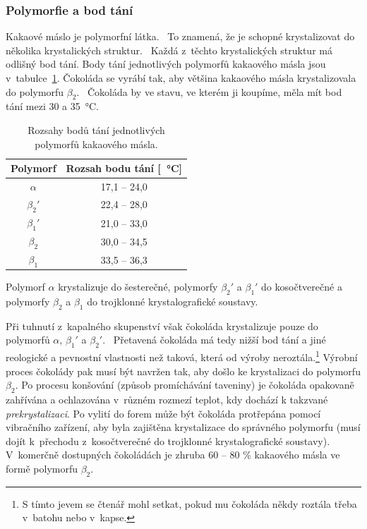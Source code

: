 \documentclass[12pt]{article}
\begin{document}
\subsubsection{Polymorfie a bod tání}%
\label{sec:polymorfie}

Kakaové máslo je polymorfní látka.~\cite{Article:cocoa_butter_polymorphism} To znamená, že je schopné krystalizovat do několika krystalických struktur.~\cite{wiki:Polymorfie} Každá z~těchto krystalických struktur má odlišný bod tání. Body tání jednotlivých polymorfů kakaového másla jsou v~tabulce~\ref{tab:polymorfy}. Čokoláda se vyrábí tak, aby většina kakaového másla krystalizovala do polymorfu $\beta_2$.~\cite{Article:cocoa_butter_tempering} Čokoláda by ve stavu, ve kterém ji koupíme, měla mít bod tání mezi 30 a \SI{35}{\degreeCelsius}.

\begin{table}
    \centering
    \begin{tabular}{|c|c|}
        \hline
        Polymorf & Rozsah bodu tání [\SI{}{\degreeCelsius}] \\\hline
        $\alpha$ & 17,1 -- 24,0\\
        $\beta_2'$ & 22,4 -- 28,0\\
        $\beta_1'$ & 21,0 -- 33,0\\
        $\beta_2$ & 30,0 -- 34,5\\
        $\beta_1$ & 33,5 -- 36,3\\
        \hline
    \end{tabular}
    \caption{Rozsahy bodů tání jednotlivých polymorfů kakaového másla.\cite{Article:cocoa_butter_polymorphism}}
    \label{tab:polymorfy}
\end{table}

Polymorf $\alpha$ krystalizuje do šesterečné, polymorfy $\beta_2'$ a $\beta_1'$ do kosočtverečné a polymorfy $\beta_2$ a $\beta_1$ do trojklonné krystalografické soustavy.~\cite{Article:precrystallization}\cite{wiki:crystal_structure}
\par\noindent
Při tuhnutí z~kapalného skupenství však čokoláda krystalizuje pouze do polymorfů $\alpha$, $\beta_1'$ a $\beta_2'$.~\cite{Article:molecular_polymorphism} Přetavená čokoláda má tedy nižší bod tání a jiné reologické a pevnostní vlastnosti než taková, která od výroby neroztála.\footnote{S tímto jevem se čtenář mohl setkat, pokud mu čokoláda někdy roztála třeba v~batohu nebo v~kapse.} Výrobní proces čokolády pak musí být navržen tak, aby došlo ke krystalizaci do polymorfu $\beta_2$. Po procesu konšování (způsob promíchávání taveniny) je čokoláda opakovaně zahřívána a ochlazována v~různém rozmezí teplot, kdy dochází k takzvané \emph{prekrystalizaci}. Po vylití do forem může být čokoláda protřepána pomocí vibračního zařízení, aby byla zajištěna krystalizace do správného polymorfu (musí dojít k~přechodu z~kosočtverečné do trojklonné krystalografické soustavy).~\cite{wiki:čokoláda}\cite{wiki:konšování}\cite{Article:viscosity_molten_milk_chocolate} V~komerčně dostupných čokoládách je zhruba 60 -- 80 \% kakaového másla ve formě polymorfu $\beta_2$.~\cite{Article:precrystallization}
\end{document}
